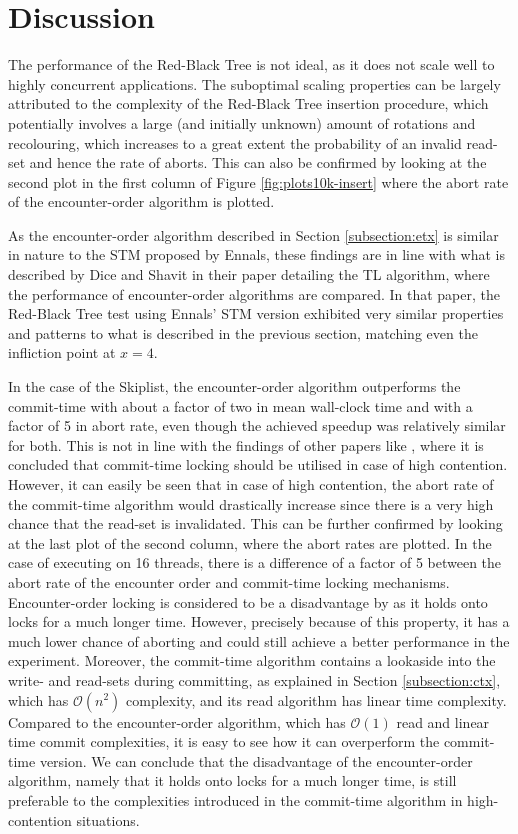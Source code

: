 \section{Discussion}

The performance of the Red-Black Tree is not ideal, as it does not scale well to highly concurrent applications. The suboptimal scaling properties can be largely attributed to the complexity of the Red-Black Tree insertion procedure, which potentially involves a large (and initially unknown) amount of rotations and recolouring, which increases to a great extent the probability of an invalid read-set and hence the rate of aborts. This can also be confirmed by looking at the second plot in the first column of Figure \ref{fig:plots10k-insert} where the abort rate of the encounter-order algorithm is plotted.

As the encounter-order algorithm described in Section \ref{subsection:etx} is similar in nature to the STM proposed by Ennals\cite{ennals-stm}, these findings are in line with what is described by Dice and Shavit in their paper detailing the TL algorithm\cite{tl}, where the performance of encounter-order algorithms are compared. In that paper, the Red-Black Tree test using Ennals' STM version exhibited very similar properties and patterns to what is described in the previous section, matching even the infliction point at $x = 4$.

In the case of the Skiplist, the encounter-order algorithm outperforms the commit-time with about a factor of two in mean wall-clock time and with a factor of 5 in abort rate, even though the achieved speedup was relatively similar for both. This is not in line with the findings of other papers like \cite{tl, tl2}, where it is concluded that commit-time locking should be utilised in case of high contention. However, it can easily be seen that in case of high contention, the abort rate of the commit-time algorithm would drastically increase since there is a very high chance that the read-set is invalidated. This can be further confirmed by looking at the last plot of the second column, where the abort rates are plotted. In the case of executing on 16 threads, there is a difference of a factor of 5 between the abort rate of the encounter order and commit-time locking mechanisms. Encounter-order locking is considered to be a disadvantage by \cite{tl, tl2} as it holds onto locks for a much longer time. However, precisely because of this property, it has a much lower chance of aborting and could still achieve a better performance in the experiment. Moreover, the commit-time algorithm contains a lookaside into the write- and read-sets during committing, as explained in Section \ref{subsection:ctx}, which has $\mathcal{O}(n^2)$ complexity, and its read algorithm has linear time complexity. Compared to the encounter-order algorithm, which has $\mathcal{O}(1)$ read and linear time commit complexities, it is easy to see how it can overperform the commit-time version. We can conclude that the disadvantage of the encounter-order algorithm, namely that it holds onto locks for a much longer time, is still preferable to the complexities introduced in the commit-time algorithm in high-contention situations.